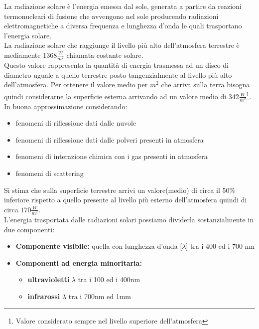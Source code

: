 La radiazione solare è l'energia emessa dal sole, generata a partire da reazioni termonucleari di fusione che avvengono nel sole producendo radiazioni elettromagnetiche a diversa frequenza e lunghezza d'onda le quali trasportano l'energia solare.\\
La radiazione solare che raggiunge il livello più alto dell'atmosfera terrestre è mediamente \(1368\frac{W}{m^2}\) chiamata costante solare.\\
Questo valore rappresenta la quantità di energia trasmessa ad un disco di diametro uguale a quello terrestre posto tangenzialmente al livello più alto dell'atmosfera. Per ottenere il valore medio per $m^2$ che arriva sulla terra bisogna quindi considerarne la superficie esterna arrivando ad un valore medio di 342$\frac{W}{m^2}$\footnote{Valore considerato sempre nel livello superiore dell'atmosfera}.\\
\newpage\noindent
In buona approssimazione considerando:
\begin{itemize}
    \item fenomeni di riflessione dati dalle nuvole
    \item fenomeni di riflessione dati dalle polveri presenti in atmosfera
    \item fenomeni di interazione chimica con i gas presenti in atmosfera
    \item fenomeni di scattering
\end{itemize}
Si stima che sulla superficie terrestre arrivi un valore(medio) di circa il 50\% inferiore rispetto a quello presente al livello più esterno dell'atmosfera quindi di circa \(170\frac{W}{m^2}\).\\
L'energia trasportata dalle radiazioni solari possiamo dividerla sostanzialmente in due componenti:
\begin{itemize}
    \item \textbf{Componente visibile:} quella con lunghezza d'onda [\textbf{$\lambda$}] tra i 400 ed i 700 nm
    \item \textbf{Componenti ad energia minoritaria:} 
        \begin{itemize}
            \item \textbf{ultravioletti} \textbf{$\lambda$} tra i 100 ed i 400nm
            \item \textbf{infrarossi} \textbf{$\lambda$} tra i 700nm ed 1mm
        \end{itemize}
\end{itemize}

